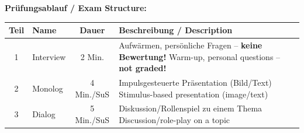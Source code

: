 \documentclass[10pt,a4paper]{article}
\begin{document}
\begin{center}
\small
\textbf{Prüfungsablauf / Exam Structure:}
\vspace{1mm}

\begin{tabular}{|c|p{3.5cm}|c|p{6cm}|}
\hline
\rowcolor{lightgray}
\textbf{Teil} & \textbf{Name} & \textbf{Dauer} & \textbf{Beschreibung / Description} \\
\hline
1 & Interview & 2 Min. & Aufwärmen, persönliche Fragen -- \textbf{keine Bewertung!} \newline \textcolor{english}{\footnotesize Warm-up, personal questions -- \textbf{not graded!}} \\
\hline
2 & Monolog & 4 Min./SuS & Impulsgesteuerte Präsentation (Bild/Text) \newline \textcolor{english}{\footnotesize Stimulus-based presentation (image/text)} \\
\hline
3 & Dialog & 5 Min./SuS & Diskussion/Rollenspiel zu einem Thema \newline \textcolor{english}{\footnotesize Discussion/role-play on a topic} \\
\hline
\end{tabular}
\end{center}

\vspace{2mm}
\end{document}
